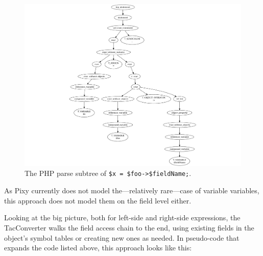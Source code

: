 \begin{figure}[htb]
  \begin{center}
    \includegraphics[scale=0.7]{images/variable-field-access-right}
   \caption{The PHP parse subtree of \texttt{\$x = \$foo->\$fieldName;}.}
   \label{fig:variable-field-access-right}
  \end{center}
\end{figure}

As Pixy currently does not model the---relatively rare---case of variable variables, this approach does not model them on the field level either.

Looking at the big picture, both for left-side and right-side expressions, the TacConverter walks the field access chain to the end, using existing fields in the object's symbol tables or creating new ones as needed. In pseudo-code that expands the code listed above, this approach looks like this:

